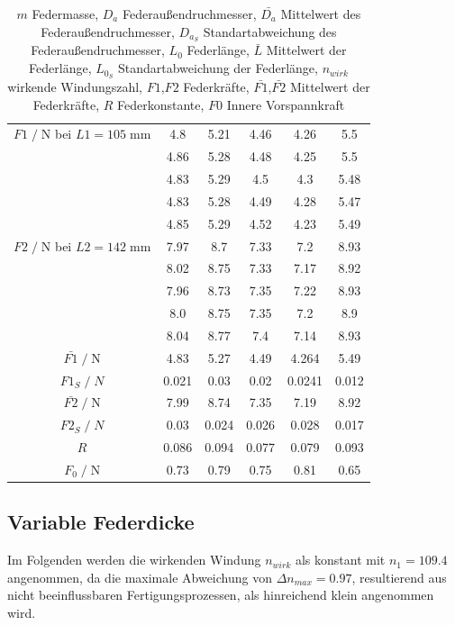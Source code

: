 \begin{table}[H]
\begin{tabular}{c | c c c c c}
        \midrule
        $F1\;/\;$N bei $L1=105\;$mm & 4.8 & 5.21 & 4.46 & 4.26 & 5.5\\
                         & 4.86 & 5.28 & 4.48 & 4.25 & 5.5\\
                         & 4.83 & 5.29 & 4.5 & 4.3 & 5.48\\
                         & 4.83 & 5.28 & 4.49 & 4.28 & 5.47\\
                         & 4.85 & 5.29 & 4.52 & 4.23 & 5.49\\
        \midrule
        $F2\;/\;$N bei $L2=142\;$mm & 7.97 & 8.7 & 7.33 & 7.2 & 8.93\\
                         & 8.02 & 8.75 & 7.33 & 7.17 & 8.92\\
                         & 7.96 & 8.73 & 7.35 & 7.22 & 8.93\\
                         & 8.0 & 8.75 & 7.35 & 7.2 & 8.9\\
                         & 8.04 & 8.77 & 7.4 & 7.14 & 8.93\\
        \midrule
        $\bar{F1}\;/\;$N & 4.83 & 5.27 & 4.49 & 4.264 & 5.49\\
        $F1_S\;/\;N$     & 0.021& 0.03 & 0.02 & 0.0241& 0.012\\ 
        $\bar{F2}\;/\;$N & 7.99 & 8.74 & 7.35 & 7.19 & 8.92\\
        $F2_S\;/\;N$     & 0.03 &0.024 & 0.026& 0.028& 0.017\\ 
        \midrule
        $R $ & 0.086 & 0.094 & 0.077 & 0.079 & 0.093\\
        \midrule
        $F_0\;/\;$N & 0.73 & 0.79 & 0.75 & 0.81 & 0.65\\ 
        \bottomrule
    \end{tabular}
    \caption{$m$ Federmasse,
             $D_a$ Federaußendruchmesser, 
             $\bar{D_a}$ Mittelwert des Federaußendruchmesser, 
             $D_{a_S}$ Standartabweichung des Federaußendruchmesser,
             $L_0$ Federlänge,
             $\bar{L}$ Mittelwert der Federlänge,
             $L_{0_S}$ Standartabweichung der Federlänge,
             $n_{wirk}$ wirkende Windungszahl,
             $F1$,$F2$ Federkräfte,
             $\bar{F1}$,$\bar{F2}$ Mittelwert der Federkräfte,
             $R$ Federkonstante,
             $F0$ Innere Vorspannkraft
    }
    \label{tab:Wertetabelle}
\end{table}


\subsection{Variable Federdicke}
\label{sec:federdicke}
Im Folgenden werden die wirkenden Windung $n_{wirk}$ als konstant mit $n_1=109.4$ angenommen, 
da die maximale Abweichung von $\Delta n_{max}=0.97$, resultierend aus nicht beeinflussbaren
Fertigungsprozessen, als hinreichend klein angenommen wird.



